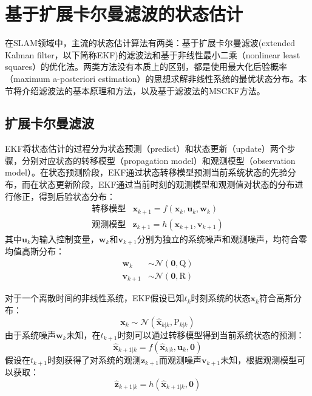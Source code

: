 \section{基于扩展卡尔曼滤波的状态估计}

在SLAM领域中，主流的状态估计算法有两类：基于扩展卡尔曼滤波(extended Kalman filter，以下简称EKF)的滤波法和基于非线性最小二乘（nonlinear least squares）的优化法。两类方法没有本质上的区别，都是使用最大化后验概率（maximum a-posteriori estimation）的思想求解非线性系统的最优状态分布。本节将介绍滤波法的基本原理和方法，以及基于滤波法的MSCKF方法。

\subsection{扩展卡尔曼滤波}

EKF将状态估计的过程分为状态预测（predict）和状态更新（update）两个步骤，分别对应状态的转移模型（propagation model）和观测模型（observation model）。在状态预测阶段，EKF通过状态转移模型预测当前系统状态的先验分布，而在状态更新阶段，EKF通过当前时刻的观测模型和观测值对状态的分布进行修正，得到后验状态分布：
\begin{equation}
\begin{array}{rl}
    \text{转移模型} & \bm{x}_{k+1} = f(\bm{x}_k,\bm{u}_k,\bm{w}_k) \\
    \text{观测模型} & \bm{z}_{k+1} = h(\bm{x}_{k+1},\bm{v}_{k+1})
\end{array}
\end{equation}
其中$\bm{u}_k$为输入控制变量，$\bm{w}_k$和$\bm{v}_{k+1}$分别为独立的系统噪声和观测噪声，均符合零均值高斯分布：
\begin{equation}
\begin{aligned}
    \bm{w}_k     &\sim \mathcal{N}(\bm{0},\mathrm{Q}) \\
    \bm{v}_{k+1} &\sim \mathcal{N}(\bm{0},\mathrm{R})
\end{aligned}
\end{equation}

对于一个离散时间的非线性系统，EKF假设已知$t_k$时刻系统的状态$\bm{x}_k$符合高斯分布：
\begin{equation}
    \bm{x}_k \sim \mathcal{N}(\hat{\bm{x}}_{k|k},\mathrm{P}_{k|k})
\end{equation}
由于系统噪声$\bm{w}_k$未知，在$t_{k+1}$时刻可以通过转移模型得到当前系统状态的预测：
\begin{equation}
    \hat{\bm{x}}_{k+1|k} = f(\hat{\bm{x}}_{k|k},\bm{u}_k,\bm{0})
\end{equation}
假设在$t_{k+1}$时刻获得了对系统的观测$\bm{z}_{k+1}$而观测噪声$\bm{v}_{k+1}$未知，根据观测模型可以获取：
\begin{equation}
    \hat{\bm{z}}_{k+1|k} = h(\hat{\bm{x}}_{k+1|k},\bm{0})
\end{equation}

